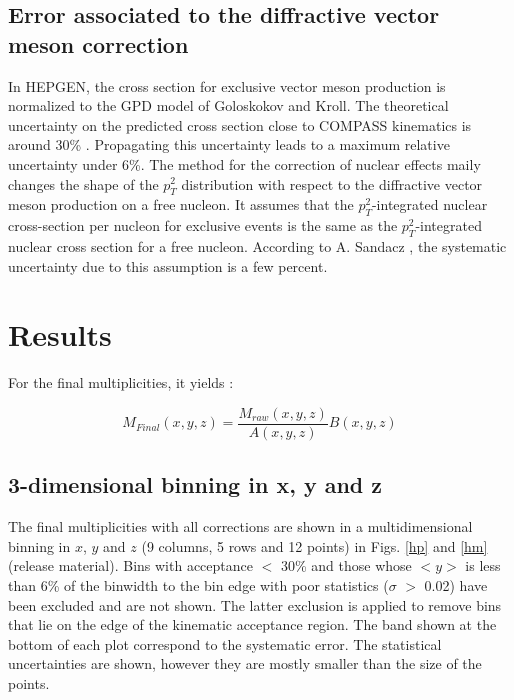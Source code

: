 \documentclass[letterpaper,12pt]{article}
\begin{document}
\subsection{Error associated to the diffractive vector meson correction}

In HEPGEN, the cross section for exclusive vector meson production is normalized to the GPD model of Goloskokov and Kroll. The theoretical uncertainty on the predicted cross section close to COMPASS kinematics is around 30\% \cite{Goloskokov}. Propagating this uncertainty leads to a maximum relative uncertainty under 6\%.
The method for the correction of nuclear effects maily changes the shape of the $p_T^2$ distribution with respect to the diffractive vector meson production on a free nucleon. It assumes that the $p_T^2$-integrated nuclear cross-section per nucleon for exclusive events is the same as the $p_T^2$-integrated nuclear cross section for a free nucleon. According to A. Sandacz \cite{Hepgen}, the systematic uncertainty due to this assumption is a few percent.

\section{Results} \label{Res}

For the final multiplicities, it yields :

\begin{equation}
	M_{Final}(x,y,z) = \frac{M_{raw}(x,y,z)}{A(x,y,z)}B(x,y,z)
\end{equation}

\subsection{3-dimensional binning in x, y and z}

The final multiplicities with all corrections are shown in a multidimensional binning in $x$, $y$ and $z$ (9 columns, 5 rows and 12 points) in Figs. \ref{hp} and \ref{hm} (release material). Bins with acceptance $<$ 30\% and those whose $<y>$ is less than 6\% of the binwidth to the bin edge with poor statistics ($\sigma$ $>$ 0.02) have been excluded and are not shown. The latter exclusion is applied to remove bins that lie on the edge of the kinematic acceptance region. The band shown at the bottom of each plot correspond to the systematic error. The statistical uncertainties are shown, however they are mostly smaller than the size of the points.
\end{document}
